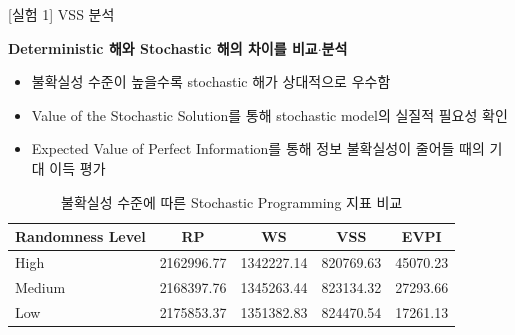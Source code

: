 \documentclass[xcolor=dvipsnames,t,9pt]{beamer}
\begin{document}

\begin{frame}{[실험 1] VSS 분석}
    \begin{block}{}
    \textbf{Deterministic 해와 Stochastic 해의 차이를 비교$\cdot$분석}
    \begin{itemize}
        \item 불확실성 수준이 높을수록 stochastic 해가 상대적으로 우수함
        \item Value of the Stochastic Solution를 통해 stochastic model의 실질적 필요성 확인
        \item Expected Value of Perfect Information를 통해 정보 불확실성이 줄어들 때의 기대 이득 평가
    \end{itemize}
    \end{block}
    
    \begin{table}[h!]
        \small
        \centering
        \caption{불확실성 수준에 따른 Stochastic Programming 지표 비교}
        \vspace{-0.5em}
        \begin{tabular}{lcccc}
            \toprule
            \textbf{Randomness Level \footnotemark[4]} & \textbf{RP} & \textbf{WS} & \textbf{VSS} & \textbf{EVPI} \\
            \midrule
            High                                       & 2162996.77  & 1342227.14  & 820769.63    & 45070.23      \\
            Medium                                     & 2168397.76  & 1345263.44  & 823134.32    & 27293.66      \\
            Low                                        & 2175853.37  & 1351382.83  & 824470.54    & 17261.13      \\
            \bottomrule
        \end{tabular}
    \end{table}
\end{frame}

\end{document}
